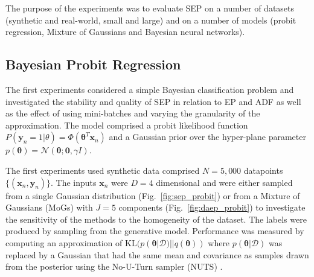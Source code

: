 
The purpose of the experiments was to evaluate SEP on a number of datasets (synthetic and real-world, small and large) and on a number of models (probit regression, Mixture of Gaussians and Bayesian neural networks).

\subsection{Bayesian Probit Regression}
%
The first experiments considered a simple Bayesian classification problem and investigated the stability and quality of SEP in relation to EP and ADF as well as the effect of using mini-batches and varying the granularity of the approximation. The model comprised a probit likelihood function $P(\bm{y}_n = 1|\theta) = \Phi(\bm{\theta}^T \bm{x}_n)$ and a Gaussian prior over the hyper-plane parameter  $p(\bm{\theta}) = \mathcal{N}(\bm{\theta}; \bm{0}, \gamma I)$.  

The first experiments used synthetic data comprised $N=5,000$ datapoints $\{ (\bm{x}_n, \bm{y}_n) \}$. The inputs $\bm{x}_n$ were $D=4$ dimensional and were either sampled from a single Gaussian distribution (Fig.~\ref{fig:sep_probit}) or from a Mixture of Gaussians (MoGs) with $J=5$ components (Fig.~\ref{fig:daep_probit}) to investigate the sensitivity of the methods to the homogeneity of the dataset. The labels were produced by sampling from the generative model. Performance was measured by computing an approximation of $\mathrm{KL}(p(\bm{\theta}|\mathcal{D}) || q(\bm{\theta}))$ where $p(\bm{\theta}|\mathcal{D})$ was replaced by a Gaussian that had the same mean and covariance as samples drawn from the posterior using the No-U-Turn sampler (NUTS) \cite{hoffman:nuts}.


